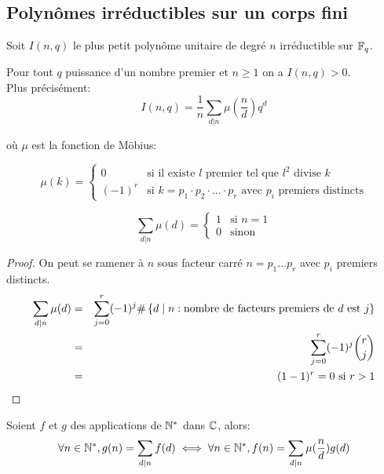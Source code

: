 \subsection{Polynômes irréductibles sur un corps fini}


Soit $I(n,q)$ le plus petit polynôme unitaire de degré $n$ irréductible sur $\mathbb{F}_q$.

\begin{theorem}
	Pour tout $q$ puissance d'un nombre premier et $n \geq 1$ on a $I(n,q) > 0$.\\

	Plus précisément:
	$$ I(n,q) = \frac{1}{n} \sum_{d|n} \mu(\frac{n}{d}) q^d$$

	où $\mu$ est la fonction de Möbius:

	\[ \mu(k) = \left\{\begin{array}{ll}
			0      & \text{si il existe } l \text{ premier tel que } l^2 \text{ divise } k                            \\
			(-1)^r & \text{si } k = p_1 \cdot p_2 \cdot \ldots \cdot p_r \text{ avec } p_i \text{ premiers distincts}
		\end{array} \right.\]

\end{theorem}

\begin{lemma}
	$$\sum_{d|n} \mu(d) = \left\{\begin{array}{ll}
			1 & \text{si } n = 1 \\
			0 & \text{sinon}
		\end{array} \right.$$
\end{lemma}

\begin{proof}
	On peut se ramener à $n$ sous facteur carré $n = p_1 \ldots p_r$ avec $p_i$ premiers distincts.\\
	\begin{eqnarray*}
		\sum_{d|n} \mu(d) &=& \sum_{j=0}^r (-1)^j \#\left\{d \mid n : \text{nombre de facteurs premiers de } d \text { est } j\right\} \\
		&=& \sum_{j=0}^r (-1)^j \binom{r}{j} \\
		&=& (1-1)^r = 0 \text{ si } r > 1
	\end{eqnarray*}
\end{proof}

\begin{lemma}
	Soient $f$ et $g$ des applications de $\mathbb{N}^*$ dans $\mathbb{C}$, alors:
	$$ \forall n \in \mathbb{N}^*, g(n) = \sum_{d|n} f(d) \iff \forall n \in \mathbb{N}^*, f(n) = \sum_{d|n} \mu(\frac n d) g(d) $$

\end{lemma}

